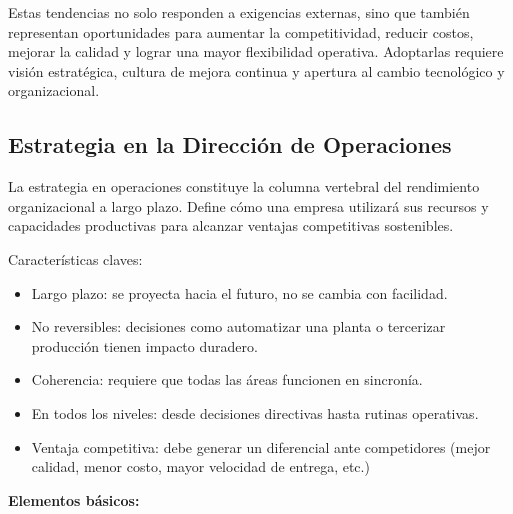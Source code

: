 \documentclass[a4paper,oneside,11pt]{article}
\begin{document}
Estas tendencias no solo responden a exigencias externas, sino que también representan oportunidades para aumentar la competitividad, reducir costos, mejorar la calidad y lograr una mayor flexibilidad operativa. Adoptarlas requiere visión estratégica, cultura de mejora continua y apertura al cambio tecnológico y organizacional.

\subsection{Estrategia en la Dirección de Operaciones}

La estrategia en operaciones constituye la columna vertebral del rendimiento organizacional a largo plazo. Define cómo una empresa utilizará sus recursos y capacidades productivas para alcanzar ventajas competitivas sostenibles.

Características claves: 

\begin{itemize}
    \item Largo plazo: se proyecta hacia el futuro, no se cambia con facilidad.
    
    \item No reversibles: decisiones como automatizar una planta o tercerizar producción tienen impacto duradero.

    \item Coherencia: requiere que todas las áreas funcionen en sincronía.

    \item En todos los niveles: desde decisiones directivas hasta rutinas operativas.

    \item Ventaja competitiva: debe generar un diferencial ante competidores (mejor calidad, menor costo, mayor velocidad de entrega, etc.)
\end{itemize}

\textbf{Elementos básicos:}
\end{document}
